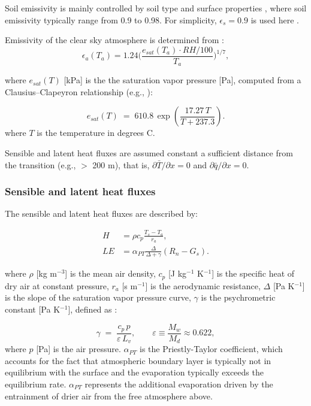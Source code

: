 \documentclass{article}
\begin{document}
    Soil emissivity is mainly controlled by soil type and surface properties \cite{evett2011water}, where soil emissivity typically range from 0.9 to 0.98. For simplicity, $\epsilon_s = 0.9$ is used here \cite{an2017assessment}.

    Emissivity of the clear sky atmosphere is determined from \cite{brutsaert1975derivable}: 
    \begin{equation}
        \epsilon_a (T_a) = 1.24 \bigg( \frac{e_{sat}(T_a)\cdot RH/100}{T_a}\bigg)^{1/7}, 
    \end{equation}

     where  $e_{sat}(T)$ [kPa] is the  the saturation vapor pressure [Pa], computed from a 
     Clausius--Clapeyron relationship (e.g., \cite{monteith1994principles}):

    \begin{equation}
    e_{sat}(T) \;=\; 610.8 \,\exp\!\left(\frac{17.27\,T}{T+237.3}\right).
    \end{equation}
    where $T$ is the temperature in degrees C.

     Sensible and latent heat fluxes are  assumed constant a sufficient distance from the transition (e.g., $>$ 200 m), that is,  $ {\partial \bar T}/{\partial x}  = 0$ and   $ {\partial \bar q}/{\partial x}= 0$.

    \subsubsection{Sensible and latent heat fluxes}

    The sensible and latent heat fluxes are described by:

    \begin{align}
    \label{eq:H_bulk}
    H &= \rho c_p\frac{T_s - T_a}{r_a},\\
    LE &= \alpha_{PT} \frac{\Delta}{\Delta+\gamma}(R_n - G_s).
    \label{eq:LE_eq}
    \end{align}

    where $\rho$ [kg m$^{-3}$] is the mean air density, 
    $c_p$ [J kg$^{-1}$ K$^{-1}$] is the specific heat of dry air at constant pressure,  $r_a$ [s m$^{-1}$] is the aerodynamic resistance,  $\Delta$ [Pa K$^{-1}$] is the slope of the saturation vapor pressure curve, 
    $\gamma$ is the psychrometric constant [Pa K$^{-1}$], defined as \citep{monteith1994principles}: 

    \begin{equation}
    \gamma \;=\; \frac{c_p\,p}{\varepsilon\,L_v},
    \qquad \varepsilon \equiv \frac{M_w}{M_d}\approx 0.622,
    \label{eq:psychrometric_constant}
    \end{equation}
    where $p$ [Pa] is the air pressure.
     $\alpha_{PT}$ is the Priestly-Taylor coefficient, which accounts for the fact that  atmospheric boundary layer is typically not in equilibrium with the surface and the evaporation typically exceeds the equilibrium rate.
     $\alpha_{PT}$ represents the additional evaporation driven by the entrainment of drier air from the free atmosphere above.
\end{document}
